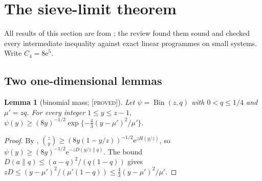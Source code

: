 \documentclass[10pt,reqno]{amsart}
\newtheorem{lemma}[theorem]{Lemma}
\theoremstyle{definition}
\theoremstyle{remark}
\newcommand{\Bin}{\operatorname{Bin}}
\newcommand{\e}{\mathrm e}
\newcommand{\lab}[1]{\textup{[\textsc{#1}]}}
\begin{document}
\section{The sieve-limit theorem}\label{sec:limit}

All results of this section are from \cite[\S2]{ET}; the review
\cite[items~1--2]{ETrev} found them sound and checked every intermediate
inequality against exact linear programmes on small systems.  Write
$C_4=8\e^5$.

\subsection{Two one-dimensional lemmas}
\begin{lemma}[binomial mass; \lab{proved}]\label{lem:binom}
Let $\psi=\Bin(z,q)$ with $0<q\leq1/4$ and $\mu'=zq$.  For every integer
$1\leq y\leq z-1$,
$\psi(y)\geq(8y)^{-1/2}\exp\{-\tfrac43(y-\mu')^2/\mu'\}$.
\end{lemma}
\begin{proof}
By \cite[Ch.~10, Lemma~7]{MS},
$\binom zy\geq(8y(1-y/z))^{-1/2}\e^{zH(y/z)}$, so
$\psi(y)\geq(8y)^{-1/2}\e^{-zD(y/z\|q)}$.  The bound
$D(a\|q)\leq(a-q)^2/(q(1-q))$ gives
$zD\leq(y-\mu')^2/(\mu'(1-q))\leq\frac43(y-\mu')^2/\mu'$.
\end{proof}
\end{document}
